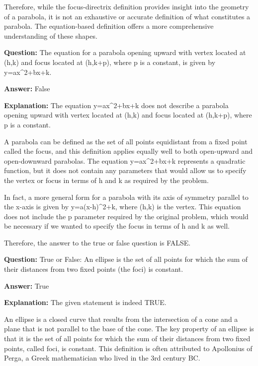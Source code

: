 \documentclass{article}
\begin{document}
Therefore, while the focus-directrix definition provides insight into the geometry of a parabola, it is not an exhaustive or accurate definition of what constitutes a parabola. The equation-based definition offers a more comprehensive understanding of these shapes.
                
                \vspace{0.5cm} 
        
            
                \textbf {Question:} The equation for a parabola opening upward with vertex located at (h,k) and focus located at (h,k+p), where p is a constant, is given by y=ax{\textasciicircum}2+bx+k.
                
                \textbf{Answer:} False

                \textbf{Explanation:} The equation y=ax{\textasciicircum}2+bx+k does not describe a parabola opening upward with vertex located at (h,k) and focus located at (h,k+p), where p is a constant.

A parabola can be defined as the set of all points equidistant from a fixed point called the focus, and this definition applies equally well to both open-upward and open-downward parabolas. The equation y=ax{\textasciicircum}2+bx+k represents a quadratic function, but it does not contain any parameters that would allow us to specify the vertex or focus in terms of h and k as required by the problem.

In fact, a more general form for a parabola with its axis of symmetry parallel to the x-axis is given by y=a(x-h){\textasciicircum}2+k, where (h,k) is the vertex. This equation does not include the p parameter required by the original problem, which would be necessary if we wanted to specify the focus in terms of h and k as well.

Therefore, the answer to the true or false question is FALSE.
                
                \vspace{0.5cm} 
        
            
                \textbf {Question:} True or False: An ellipse is the set of all points for which the sum of their distances from two fixed points (the foci) is constant.
                
                \textbf{Answer:} True

                \textbf{Explanation:} The given statement is indeed TRUE.

An ellipse is a closed curve that results from the intersection of a cone and a plane that is not parallel to the base of the cone. The key property of an ellipse is that it is the set of all points for which the sum of their distances from two fixed points, called foci, is constant. This definition is often attributed to Apollonius of Perga, a Greek mathematician who lived in the 3rd century BC.
\end{document}
